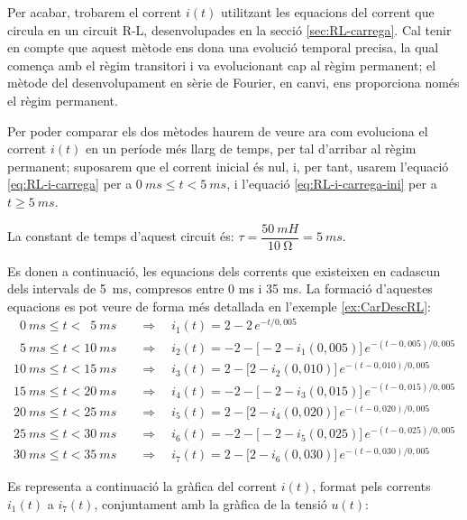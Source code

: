 \begin{exemple}
    Per acabar, trobarem el corrent $i(t)$ utilitzant les equacions del corrent que circula en un circuit R-L, desenvolupades en la secció \vref{sec:RL-carrega}. Cal tenir en compte que aquest mètode ens dona una evolució temporal precisa, la qual comença amb el règim transitori i va evolucionant cap al règim permanent; el mètode del desenvolupament en sèrie de Fourier, en canvi, ens proporciona només el règim permanent.

    Per  poder comparar els dos mètodes haurem de veure  ara com evoluciona el corrent $i(t)$ en un període més llarg de temps, per tal d'arribar al règim permanent; suposarem que el corrent inicial és nul, i, per tant, usarem l'equació \eqref{eq:RL-i-carrega} per a $\qty{0}{ms} \leq t < \qty{5}{ms}$, i l'equació \eqref{eq:RL-i-carrega-ini} per a $t \geq \qty{5}{ms}$.

    La constant de temps d'aquest circuit és: $\tau = \dfrac{\qty{50}{mH}}{\qty{10}{\ohm}} = \qty{5}{ms}$.


    Es donen a continuació, les equacions dels corrents que existeixen en cadascun dels intervals de \qty{5}{ms}, compresos entre 0 ms i 35 ms. La formació d'aquestes equacions es pot veure de forma més detallada en l'exemple \vref{ex:CarDescRL}:
    \begin{align*}
      \phantom{0}\qty{0}{ms} \leq t < \phantom{0}\qty{5}{ms}  & \quad\Rightarrow\quad i_1(t) = 2 - 2 \,e^{-t/0,005} \\
      \phantom{0}\qty{5}{ms} \leq t < \qty{10}{ms} & \quad\Rightarrow\quad i_2(t) = -2 - \big[-2 - i_1(0,005)\big]\, e^{-(t-0,005)/0,005}  \\
      \qty{10}{ms}\leq t < \qty{15}{ms} & \quad\Rightarrow\quad i_3(t) = 2 - \big[2 - i_2(0,010)\big]\, e^{-(t-0,010)/0,005} \\
      \qty{15}{ms} \leq t < \qty{20}{ms} & \quad\Rightarrow\quad i_4(t) = -2 - \big[-2 - i_3(0,015)\big]\, e^{-(t-0,015)/0,005}  \\
      \qty{20}{ms}\leq t < \qty{25}{ms} & \quad\Rightarrow\quad i_5(t) = 2 - \big[2 - i_4(0,020)\big]\, e^{-(t-0,020)/0,005} \\
      \qty{25}{ms} \leq t < \qty{30}{ms} & \quad\Rightarrow\quad i_6(t) = -2 - \big[-2 - i_5(0,025)\big]\, e^{-(t-0,025)/0,005}  \\
      \qty{30}{ms}\leq t < \qty{35}{ms} & \quad\Rightarrow\quad i_7(t) = 2 - \big[2 - i_6(0,030)\big]\, e^{-(t-0,030)/0,005}
    \end{align*}

    Es representa a continuació la gràfica del corrent $i(t)$, format pels corrents $i_1(t)$ a $i_7(t)$, conjuntament amb la gràfica de la tensió $u(t)$:
    \begin{center}
      
    \end{center}


\end{exemple}
